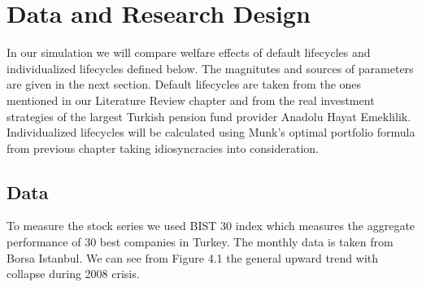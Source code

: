 \chapter{Data and Research Design}
\label{data}

In our simulation we will compare welfare effects of default lifecycles and individualized lifecycles defined below. The magnitutes and sources of parameters are given in the next section. Default lifecycles are taken from the ones mentioned in our Literature Review chapter and from the real investment strategies of the largest Turkish pension fund provider Anadolu Hayat Emeklilik. Individualized lifecycles will be calculated using Munk's optimal portfolio formula from previous chapter taking idiosyncracies into consideration.

\section{Data}

To measure the stock series we used BIST 30 index which measures the aggregate performance of 30 best companies in Turkey. The monthly data is taken from Borsa Istanbul. We can see from Figure 4.1 the general upward trend with collapse during 2008 crisis.

